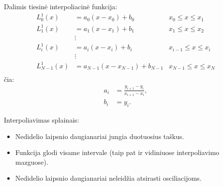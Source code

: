 Dalimis tiesinė interpoliacinė funkcija:
\begin{align*}
  L_{0}^{1}(x) &= a_{0}(x-x_{0}) + b_{0} & x_{0} \leq x \leq x_{1} \\
  L_{1}^{1}(x) &= a_{1}(x-x_{1}) + b_{1} & x_{1} \leq x \leq x_{2} \\
               & \vdots \\
  L_{i}^{1}(x) &= a_{i}(x-x_{i}) + b_{i} & x_{i-1} \leq x \leq x_{i} \\
               & \vdots \\
  L_{N-1}^{1}(x) &= a_{N-1}(x-x_{N-1}) + b_{N-1} & x_{N-1} \leq x \leq x_{N} \\
\end{align*}
čia:
\begin{align*}
  a_{i} &= \frac{y_{i+1} - y_{i}}{x_{i+1} - x_{i}}, \\
  b_{i} &= y_{i}.
\end{align*}




Interpoliavimas splainais:
\begin{itemize}
  \item Nedidelio laipsnio daugianariai jungia duotuosius taškus.
  \item Funkcija glodi visame intervale (taip pat ir vidiniuose interpoliavimo
    mazguose).
  \item Nedidelio laipsnio daugianariai neleidžia atsirasti osciliacijoms.
\end{itemize}










